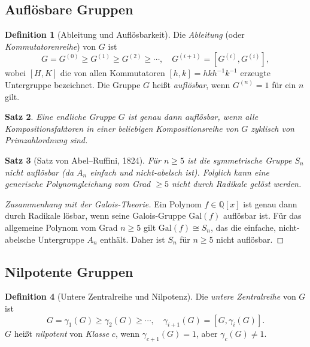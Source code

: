 \documentclass[12pt,a4paper]{amsart}
\newtheorem{theorem}{Satz}[section]
\theoremstyle{definition}
\newtheorem{definition}[theorem]{Definition}
\begin{document}
\subsection{Auflösbare Gruppen}

\begin{definition}[Ableitung und Auflösbarkeit]
Die \emph{Ableitung} (oder \emph{Kommutatorenreihe}) von $G$ ist
\[
  G = G^{(0)} \geq G^{(1)} \geq G^{(2)} \geq \cdots,
  \quad G^{(i+1)} = [G^{(i)}, G^{(i)}],
\]
wobei $[H, K]$ die von allen Kommutatoren $[h,k] = hkh^{-1}k^{-1}$ erzeugte Untergruppe
bezeichnet. Die Gruppe $G$ heißt \emph{auflösbar}, wenn $G^{(n)} = 1$ für ein $n$ gilt.
\end{definition}

\begin{theorem}
Eine endliche Gruppe $G$ ist genau dann auflösbar, wenn alle Kompositionsfaktoren in einer
beliebigen Kompositionsreihe von $G$ zyklisch von Primzahlordnung sind.
\end{theorem}

\begin{theorem}[Satz von Abel--Ruffini, 1824]
\label{thm:abel_ruffini}
Für $n \geq 5$ ist die symmetrische Gruppe $S_n$ \emph{nicht} auflösbar (da $A_n$ einfach
und nicht-abelsch ist). Folglich kann eine generische Polynomgleichung vom Grad $\geq 5$
nicht durch Radikale gelöst werden.
\end{theorem}

\begin{proof}[Zusammenhang mit der Galois-Theorie]
Ein Polynom $f \in \mathbb{Q}[x]$ ist genau dann durch Radikale lösbar, wenn seine
Galois-Gruppe $\mathrm{Gal}(f)$ auflösbar ist. Für das allgemeine Polynom vom Grad
$n \geq 5$ gilt $\mathrm{Gal}(f) \cong S_n$, das die einfache, nicht-abelsche Untergruppe
$A_n$ enthält. Daher ist $S_n$ für $n \geq 5$ nicht auflösbar.
\end{proof}

\subsection{Nilpotente Gruppen}

\begin{definition}[Untere Zentralreihe und Nilpotenz]
Die \emph{untere Zentralreihe} von $G$ ist
\[
  G = \gamma_1(G) \geq \gamma_2(G) \geq \cdots,
  \quad \gamma_{i+1}(G) = [G, \gamma_i(G)].
\]
$G$ heißt \emph{nilpotent} von \emph{Klasse} $c$, wenn $\gamma_{c+1}(G) = 1$, aber
$\gamma_c(G) \neq 1$.
\end{definition}
\end{document}
